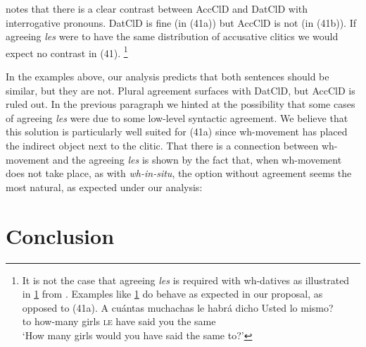 \documentclass[output=paper,colorlinks,citecolor=brown,
]{langscibook}
\begin{document}
\citet{suñer1988} notes that there is a clear contrast between AccClD and DatClD with interrogative pronouns. DatClD is fine (in (41a)) but AccClD is not (in (41b)). If agreeing \textit{les} were to have the same distribution of accusative clitics we would expect no contrast in (41).
\footnote{\textrm{ It is not the case that agreeing }\textrm{\textit{les}}\textrm{ is required with wh-datives as illustrated in \ref{ex:ausin:agreeingles} from \citet{kany1945}. Examples like \ref{ex:ausin:agreeingles} do behave as expected in our proposal, as opposed to (41a).}
\ea \label{ex:ausin:agreeingles}
\gll A cuántas muchachas le habrá dicho Usted lo mismo?\\
 to how-many girls \textsc{le} have said you the same\\
\glt `How many girls would you have said the same to?'
\z}




In the examples above, our analysis predicts that both sentences should be similar, but they are not. Plural agreement surfaces with DatClD, but AccClD is ruled out. In the previous paragraph we hinted at the possibility that some cases of agreeing \textit{les} were due to some low-level syntactic agreement. We believe that this solution is particularly well suited for (41a) since wh-movement has placed the indirect object next to the clitic. That there is a connection between wh-movement and the agreeing \textit{les} is shown by the fact that, when wh-movement does not take place, as with \textit{wh-in-situ}, the option without agreement seems the most natural, as expected under our analysis:




\section{Conclusion}
\end{document}
